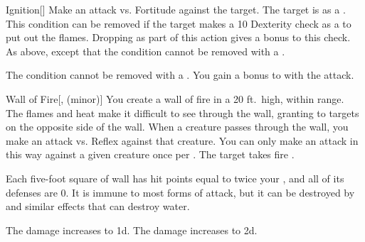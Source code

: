 \lowercase{\hypertarget{spell:Ignition}{}}\label{spell:Ignition}
\begin{freeability}[Rank 4]{\hypertarget{spell:Ignition}{Ignition}}[]
Make an attack vs. Fortitude against the target.
\hit The target is  as a .
This condition can be removed if the target makes a  10 Dexterity check as a  to put out the flames.
Dropping  as part of this action gives a  bonus to this check.
\crit As above, except that the condition cannot be removed with a .

\rankline
{} The condition cannot be removed with a .
 You gain a  bonus to  with the attack.

\end{freeability}
\vspace{0.25em}



\lowercase{\hypertarget{spell:Wall of Fire}{}}\label{spell:Wall of Fire}
\begin{freeability}[Rank 4]{\hypertarget{spell:Wall of Fire}{Wall of Fire}}[,  (minor)]
You create a wall of fire in a 20 ft.\ high, \arealarge {} within \rngmed range.
The flames and heat make it difficult to see through the wall, granting  to targets on the opposite side of the wall.
When a creature passes through the wall, you make an attack vs. Reflex against that creature.
You can only make an attack in this way against a given creature once per .
\hit The target takes fire .

Each five-foot square of wall has hit points equal to twice your , and all of its defenses are 0.
It is immune to most forms of attack, but it can be destroyed by  and similar effects that can destroy water.

\rankline
{} The damage increases to  \plus1d.
 The damage increases to  \plus2d.

\end{freeability}
\vspace{0.25em}



